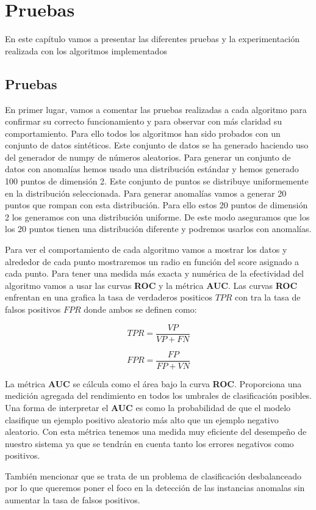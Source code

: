 \chapter{Pruebas}
En este capítulo vamos a presentar las diferentes pruebas y la experimentación
realizada con los algoritmos implementados

\section{Pruebas}
En primer lugar, vamos a comentar las pruebas realizadas a cada algoritmo
para confirmar su correcto funcionamiento y para observar con más claridad
su comportamiento. Para ello todos los algoritmos han sido probados con un
conjunto de datos sintéticos. Este conjunto de datos se ha generado haciendo
uso del generador de numpy de números aleatorios. Para generar un conjunto
de datos con anomalías hemos usado una distribución estándar y hemos generado 
100 puntos de dimensión 2. Este conjunto de puntos se distribuye uniformemente
en la distribución seleccionada. Para generar anomalías vamos a generar 20
puntos que rompan con esta distribución. Para ello estos 20 puntos de dimensión
2 los generamos con una distribución uniforme. De este modo aseguramos que los 
los 20 puntos tienen una distribución diferente y podremos usarlos con anomalías.

Para ver el comportamiento de cada algoritmo vamos a mostrar los datos y 
alrededor de cada punto mostraremos un radio en función del score asignado a
cada punto. Para tener una medida más exacta y numérica de la efectividad del
algoritmo vamos a usar las curvas \textbf{ROC} y la métrica \textbf{AUC}.
Las curvas \textbf{ROC} enfrentan en una grafica la tasa de verdaderos
positicos $TPR$ con tra la tasa de falsos positivos $FPR$ donde ambos se definen como:

\[ TPR = \frac{VP}{VP + FN}\]

\[FPR = \frac{FP}{FP +VN}\]

La métrica \textbf{AUC} se cálcula como el área bajo la curva \textbf{ROC}. Proporciona 
una medición agregada del rendimiento en todos los umbrales de clasificación 
posibles. Una forma de interpretar el \textbf{AUC} es como la probabilidad de 
que el modelo clasifique un ejemplo positivo aleatorio más alto que un ejemplo 
negativo aleatorio.
Con esta métrica tenemos una medida muy eficiente del desempeño de nuestro
sistema ya que se tendrán en cuenta tanto los errores negativos como positivos.

También mencionar que se trata de un problema de clasificación desbalanceado por lo que
queremos poner el foco en la detección de las instancias anomalas sin aumentar la tasa
de falsos positivos.

